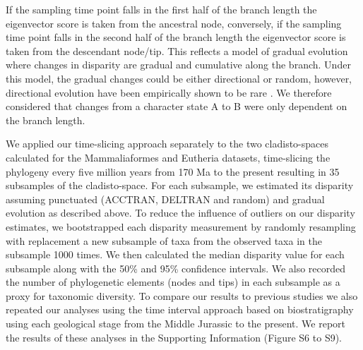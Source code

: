 \documentclass[12pt,letterpaper]{article}
\begin{document}
\begin{enumerate}
    If the sampling time point falls in the first half of the branch length the eigenvector score is taken from the ancestral node, conversely, if the sampling time point falls in the second half of the branch length the eigenvector score is taken from the descendant node/tip.
    This reflects a model of gradual evolution where changes in disparity are gradual and cumulative along the branch.
    Under this model, the gradual changes could be either directional or random, however, directional evolution have been empirically shown to be rare \citep[only 5\% of the time][]{Hunt20112007}.
    We therefore considered that changes from a character state A to B were only dependent on the branch length.
\end{enumerate}
We applied our time-slicing approach separately to the two cladisto-spaces calculated for the Mammaliaformes and Eutheria datasets, time-slicing the phylogeny every five million years from 170 Ma to the present resulting in 35 subsamples of the cladisto-space.
For each subsample, we estimated its disparity assuming punctuated (ACCTRAN, DELTRAN and random) and gradual evolution as described above.
To reduce the influence of outliers on our disparity estimates, we bootstrapped each disparity measurement by randomly resampling with replacement a new subsample of taxa from the observed taxa in the subsample 1000 times.
We then calculated the median disparity value for each subsample along with the 50\% and 95\% confidence intervals.
We also recorded the number of phylogenetic elements (nodes and tips) in each subsample as a proxy for taxonomic diversity.
To compare our results to previous studies we also repeated our analyses using the time interval approach based on biostratigraphy \citep[e.g.][]{cisneros2010,prentice2011,Hughes20082013,bentonmodels2014} using each geological stage from the Middle Jurassic to the present.
We report the results of these analyses in the Supporting Information (Figure S6 to S9).

\end{document}

